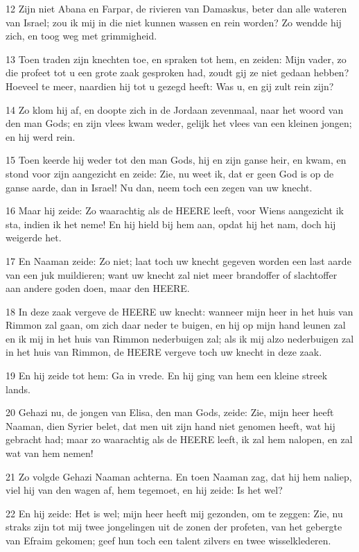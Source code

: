 \par 12 Zijn niet Abana en Farpar, de rivieren van Damaskus, beter dan alle wateren van Israel; zou ik mij in die niet kunnen wassen en rein worden? Zo wendde hij zich, en toog weg met grimmigheid.
\par 13 Toen traden zijn knechten toe, en spraken tot hem, en zeiden: Mijn vader, zo die profeet tot u een grote zaak gesproken had, zoudt gij ze niet gedaan hebben? Hoeveel te meer, naardien hij tot u gezegd heeft: Was u, en gij zult rein zijn?
\par 14 Zo klom hij af, en doopte zich in de Jordaan zevenmaal, naar het woord van den man Gods; en zijn vlees kwam weder, gelijk het vlees van een kleinen jongen; en hij werd rein.
\par 15 Toen keerde hij weder tot den man Gods, hij en zijn ganse heir, en kwam, en stond voor zijn aangezicht en zeide: Zie, nu weet ik, dat er geen God is op de ganse aarde, dan in Israel! Nu dan, neem toch een zegen van uw knecht.
\par 16 Maar hij zeide: Zo waarachtig als de HEERE leeft, voor Wiens aangezicht ik sta, indien ik het neme! En hij hield bij hem aan, opdat hij het nam, doch hij weigerde het.
\par 17 En Naaman zeide: Zo niet; laat toch uw knecht gegeven worden een last aarde van een juk muildieren; want uw knecht zal niet meer brandoffer of slachtoffer aan andere goden doen, maar den HEERE.
\par 18 In deze zaak vergeve de HEERE uw knecht: wanneer mijn heer in het huis van Rimmon zal gaan, om zich daar neder te buigen, en hij op mijn hand leunen zal en ik mij in het huis van Rimmon nederbuigen zal; als ik mij alzo nederbuigen zal in het huis van Rimmon, de HEERE vergeve toch uw knecht in deze zaak.
\par 19 En hij zeide tot hem: Ga in vrede. En hij ging van hem een kleine streek lands.
\par 20 Gehazi nu, de jongen van Elisa, den man Gods, zeide: Zie, mijn heer heeft Naaman, dien Syrier belet, dat men uit zijn hand niet genomen heeft, wat hij gebracht had; maar zo waarachtig als de HEERE leeft, ik zal hem nalopen, en zal wat van hem nemen!
\par 21 Zo volgde Gehazi Naaman achterna. En toen Naaman zag, dat hij hem naliep, viel hij van den wagen af, hem tegemoet, en hij zeide: Is het wel?
\par 22 En hij zeide: Het is wel; mijn heer heeft mij gezonden, om te zeggen: Zie, nu straks zijn tot mij twee jongelingen uit de zonen der profeten, van het gebergte van Efraim gekomen; geef hun toch een talent zilvers en twee wisselklederen.
